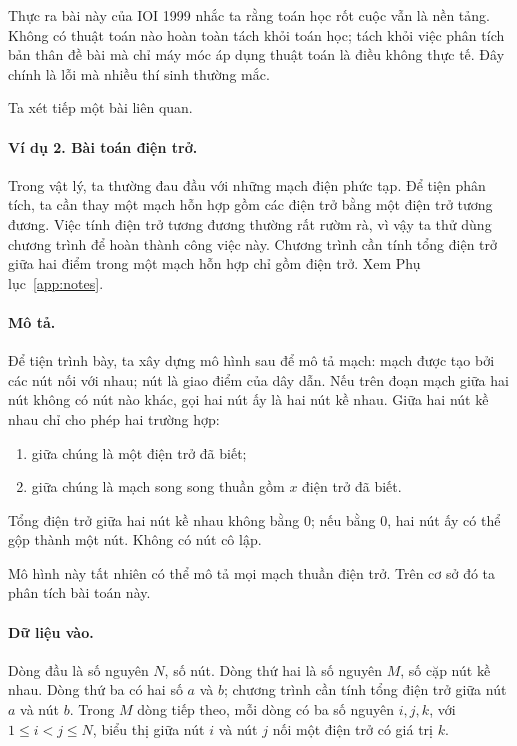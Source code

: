 \documentclass[11pt]{article}
\begin{document}
Thực ra bài này của IOI 1999 nhắc ta rằng toán học rốt cuộc vẫn là nền tảng.
Không có thuật toán nào hoàn toàn tách khỏi toán học; tách khỏi việc phân
tích bản thân đề bài mà chỉ máy móc áp dụng thuật toán là điều không thực tế.
Đây chính là lỗi mà nhiều thí sinh thường mắc.

Ta xét tiếp một bài liên quan.

\paragraph{Ví dụ 2. Bài toán điện trở.}
Trong vật lý, ta thường đau đầu với những mạch điện phức tạp. Để tiện phân
tích, ta cần thay một mạch hỗn hợp gồm các điện trở bằng một điện trở tương
đương. Việc tính điện trở tương đương thường rất rườm rà, vì vậy ta thử dùng
chương trình để hoàn thành công việc này. Chương trình cần tính tổng điện trở
giữa hai điểm trong một mạch hỗn hợp chỉ gồm điện trở. Xem
Phụ lục~\ref{app:notes}.

\paragraph{Mô tả.}
Để tiện trình bày, ta xây dựng mô hình sau để mô tả mạch: mạch được tạo bởi
các nút nối với nhau; nút là giao điểm của dây dẫn. Nếu trên đoạn mạch giữa
hai nút không có nút nào khác, gọi hai nút ấy là hai nút kề nhau. Giữa hai
nút kề nhau chỉ cho phép hai trường hợp:
\begin{enumerate}
  \item giữa chúng là một điện trở đã biết;
  \item giữa chúng là mạch song song thuần gồm \(x\) điện trở đã biết.
\end{enumerate}
Tổng điện trở giữa hai nút kề nhau không bằng 0; nếu bằng 0, hai nút ấy có
thể gộp thành một nút. Không có nút cô lập.

Mô hình này tất nhiên có thể mô tả mọi mạch thuần điện trở. Trên cơ sở đó ta
phân tích bài toán này.

\paragraph{Dữ liệu vào.}
Dòng đầu là số nguyên \(N\), số nút. Dòng thứ hai là số nguyên \(M\), số cặp
nút kề nhau. Dòng thứ ba có hai số \(a\) và \(b\); chương trình cần tính tổng
điện trở giữa nút \(a\) và nút \(b\). Trong \(M\) dòng tiếp theo, mỗi dòng có
ba số nguyên \(i,j,k\), với \(1\le i<j\le N\), biểu thị giữa nút \(i\) và
nút \(j\) nối một điện trở có giá trị \(k\).
\end{document}

